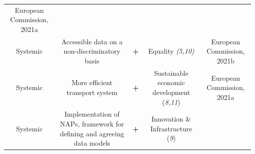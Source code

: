 \documentclass[
]{book}
\begin{document}
\begin{longtable}[]{@{}ccccc@{}}
\begin{minipage}[t]{0.17\columnwidth}
European Commission, 2021a\strut
\end{minipage}\tabularnewline
\begin{minipage}[t]{0.17\columnwidth}\centering
Systemic\strut
\end{minipage} & \begin{minipage}[t]{0.16\columnwidth}\centering
Accessible data on a non-discriminatory basis\strut
\end{minipage} & \begin{minipage}[t]{0.17\columnwidth}\centering
\textbf{+}\strut
\end{minipage} & \begin{minipage}[t]{0.17\columnwidth}\centering
Equality \emph{(5,10)}\strut
\end{minipage} & \begin{minipage}[t]{0.17\columnwidth}\centering
European Commission, 2021b\strut
\end{minipage}\tabularnewline
\begin{minipage}[t]{0.17\columnwidth}\centering
Systemic\strut
\end{minipage} & \begin{minipage}[t]{0.16\columnwidth}\centering
More efficient transport system\strut
\end{minipage} & \begin{minipage}[t]{0.17\columnwidth}\centering
\textbf{+}\strut
\end{minipage} & \begin{minipage}[t]{0.17\columnwidth}\centering
Sustainable economic development (\emph{8,11})\strut
\end{minipage} & \begin{minipage}[t]{0.17\columnwidth}\centering
European Commission, 2021a\strut
\end{minipage}\tabularnewline
\begin{minipage}[t]{0.17\columnwidth}\centering
Systemic\strut
\end{minipage} & \begin{minipage}[t]{0.16\columnwidth}\centering
Implementation of NAPs, framework for defining and agreeing data models\strut
\end{minipage} & \begin{minipage}[t]{0.17\columnwidth}\centering
\textbf{+}\strut
\end{minipage} & \begin{minipage}[t]{0.17\columnwidth}\centering
Innovation \& Infrastructure (\emph{9})\strut
\end{minipage} & \begin{minipage}[t]{0.17\columnwidth}\centering

\end{minipage}
\end{longtable}
\end{document}
